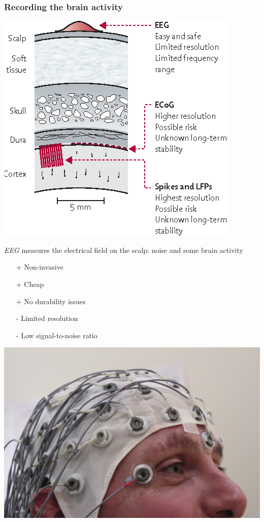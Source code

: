 \documentclass{kul-ulille-beamer}
\begin{document}
\begin{frame}
  \frametitle{Recording the brain activity}%
  \begin{minipage}{.5\textwidth}
    \centering
    \includegraphics[width=.9\textwidth]{figures/intro/modalities.png}
  \end{minipage}\hfill%
  \begin{minipage}{.4\textwidth}
    \vspace{-1cm}
    \emph{EEG}  measures the electrical field on the
    scalp: noise and some brain activity
    \begin{itemize}
      \item[\textcolor{mygreen}{+}] Non-invasive
      \item[\textcolor{mygreen}{+}] Cheap
      \item[\textcolor{mygreen}{+}] No durability issues
      \item[\textcolor{myred}{-}] Limited resolution
      \item[\textcolor{myred}{-}] Low signal-to-noise ratio
    \end{itemize}
    \bigskip

    \centering
    \includegraphics[width=.7\textwidth]{figures/intro/eeg.jpg}
  \end{minipage}
\end{frame}
\end{document}
